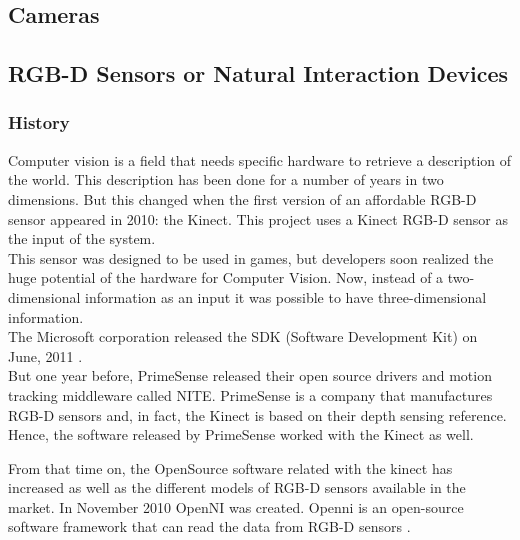\subsection{Cameras}
\label{cameras}



\subsection{RGB-D Sensors or Natural Interaction Devices}
\label{rgb-d}
\subsubsection{History}

Computer vision is a field that needs specific hardware to retrieve a description of the world. This description has been done for a number of years in two dimensions. But this changed when the first version of an affordable RGB-D sensor appeared in 2010: the Kinect. This project uses a Kinect RGB-D sensor as the input of the system.
\\

This sensor was designed to be used in games, but developers soon realized the huge potential of the hardware for Computer Vision.  
Now, instead of a two-dimensional information as an input it was possible to have three-dimensional information. 
\\

The Microsoft corporation released the SDK (Software Development Kit) on June, 2011 \cite{kinectSDK}.
\\

But one year before, PrimeSense released their open source drivers and motion tracking middleware called NITE\cite{NITE}. 
PrimeSense is a company that manufactures RGB-D sensors and, in fact, the Kinect is based on their depth sensing reference. Hence, the software released by PrimeSense worked with the Kinect as well. 

From that time on, the OpenSource software related with the kinect has increased as well as the different models of RGB-D sensors available in the market.
In November 2010 OpenNI was created. Openni is an open-source software framework that can read the data from RGB-D sensors \cite{openni}.  

